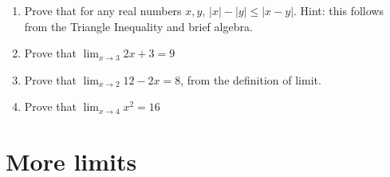 \documentclass[12pt]{article}
\begin{document}
\begin{enumerate}
\item  Prove that for any real numbers $x,y$, $|x| - |y| \leq |x-y|$.  Hint:  this follows from the Triangle Inequality and brief algebra.

\item Prove that $\lim_{x \rightarrow 3}2x+3 = 9$

\item  Prove that $\lim_{x \rightarrow 2}12-2x = 8$, from the definition of limit.

\item Prove that $\lim_{x \rightarrow 4}x^2 = 16$

\begin{comment}

\item  Prove that $\lim_{x \rightarrow 2}\frac{x^2-4}{x-2} = 4$ from the definition of limit.
Hint:  so far you have not used both parts of the hypothesis $0<|x-a|<\delta$;  in this proof you will.

\end{comment}

\end{enumerate}

\section{More limits}
\end{document}
